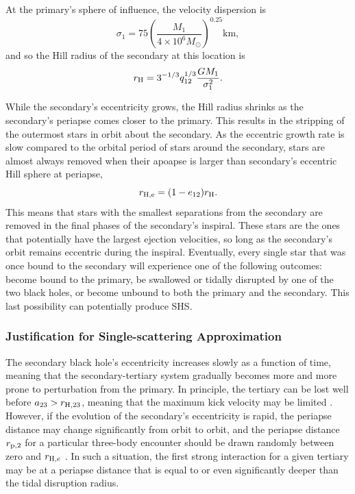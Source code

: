 \documentclass[a4paper,twocolumn]{emulateapj}
\begin{document}
{At the primary's sphere of influence, the velocity dispersion is \citep{Kormendy:2013a}
\begin{equation}
\sigma_{1} = 75 \left(\frac{M_{1}}{4 \times 10^{6} M_{\odot}}\right)^{0.25} \textrm{km}\label{eq:sigma},
\end{equation}
and so the Hill radius of the secondary at this location is
\begin{equation}
r_{\rm H} = 3^{-1/3} q_{12}^{1/3} \frac{G M_{1}}{\sigma_{1}^{2}}.
\end{equation}

While the secondary's eccentricity grows, the Hill radius shrinks as the secondary's periapse comes closer to the primary. This results in the stripping of the outermost stars in orbit about the secondary. As the eccentric growth rate is slow compared to the orbital period of stars around the secondary, stars are almost always removed when their apoapse is larger than secondary's eccentric Hill sphere at periapse,
\begin{equation}
r_{\rm H,e} = (1 - e_{12}) r_{\rm H}.
\end{equation}
This means that stars with the smallest separations from the secondary are removed in the final phases of the secondary's inspiral. These stars are the ones that potentially have the largest ejection velocities, so long as the secondary's orbit remains eccentric during the inspiral. Eventually, every single star that was once bound to the secondary will experience one of the following outcomes: become bound to the primary, be swallowed or tidally disrupted by one of the two black holes, or become unbound to both the primary and the secondary. This last possibility can potentially produce SHS.

\subsubsection{Justification for Single-scattering Approximation}\label{sec:singlescat}
The secondary black hole's eccentricity increases slowly as a function of time, meaning that the secondary-tertiary system gradually becomes more and more prone to perturbation from the primary. In principle, the tertiary can be lost well before $a_{23} > r_{{\rm H},23}$, meaning that the maximum kick velocity may be limited \citep{Sari:2010a}. However, if the evolution of the secondary's eccentricity is rapid, the periapse distance may change significantly from orbit to orbit, and the periapse distance $r_{\rm p,2}$ for a particular three-body encounter should be drawn randomly between zero and $r_{{\rm H},e}$ \citep[i.e. ``pinhole'' scattering,][]{Lightman:1977a}. In such a situation, the first strong interaction for a given tertiary may be at a periapse distance that is equal to or even significantly deeper than the tidal disruption radius.

}
\end{document}
